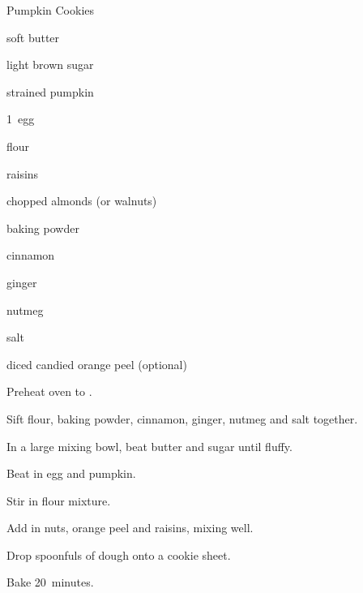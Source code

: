 \begin{recipe}{Pumpkin Cookies}{}{}

\begin{ingredients}
\item \C{\quarter} soft butter
\item \C{\half} light brown sugar
\item \C{\half} strained pumpkin
\item 1~egg
\item {} flour
\item \C{\half} raisins
\item \C{\half}  chopped almonds (or walnuts)
\item {} baking powder
\item {} cinnamon
\item \tp{\quarter} ginger
\item \tp{\quarter} nutmeg
\item \tp{\quarter} salt
\item \C{\quarter} diced candied orange peel (optional)
\end{ingredients}

\begin{directions}
\item Preheat oven to . 
\item Sift flour, baking powder, cinnamon, ginger, nutmeg and salt together.
\item In a large mixing bowl, beat butter and sugar until fluffy. 
\item Beat in egg and pumpkin.
\item Stir in flour mixture. 
\item Add in nuts, orange peel and raisins, mixing well. 
\item Drop spoonfuls of dough onto a cookie sheet. 
\item Bake 20~minutes.
\end{directions}
\end{recipe}
